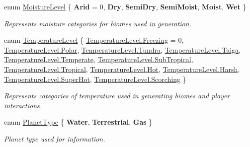 \begin{DoxyCompactItemize}
\item 
enum \hyperlink{namespace_midnight_blue_a7428767e7fc0b52bab6cb270f8354e1d}{Moisture\+Level} \{ \newline
{\bfseries Arid} = 0, 
{\bfseries Dry}, 
{\bfseries Semi\+Dry}, 
{\bfseries Semi\+Moist}, 
\newline
{\bfseries Moist}, 
{\bfseries Wet}
 \}\begin{DoxyCompactList}\small\item\em Represents moisture categories for biomes used in generation. \end{DoxyCompactList}
\item 
enum \hyperlink{namespace_midnight_blue_a6ea6484178cbe707f25d1a0ed56db7ab}{Temperature\+Level} \{ \newline
\hyperlink{namespace_midnight_blue_a6ea6484178cbe707f25d1a0ed56db7aba64a54c31b5b440b2f5a00a723df03ec4}{Temperature\+Level.\+Freezing} = 0, 
\hyperlink{namespace_midnight_blue_a6ea6484178cbe707f25d1a0ed56db7abae266cfd65ad46a67fc54b0efd38e40dd}{Temperature\+Level.\+Polar}, 
\hyperlink{namespace_midnight_blue_a6ea6484178cbe707f25d1a0ed56db7abac63e2bf2eb1c92832e0a76fb3734abe8}{Temperature\+Level.\+Tundra}, 
\hyperlink{namespace_midnight_blue_a6ea6484178cbe707f25d1a0ed56db7aba32864c09ef538453b4d8110734ee355b}{Temperature\+Level.\+Taiga}, 
\newline
\hyperlink{namespace_midnight_blue_a6ea6484178cbe707f25d1a0ed56db7abae83280629ee0ad3886e8921fb8927ced}{Temperature\+Level.\+Temperate}, 
\hyperlink{namespace_midnight_blue_a6ea6484178cbe707f25d1a0ed56db7abaee38ff3caffad90ba40d7fd7ce41c9ae}{Temperature\+Level.\+Sub\+Tropical}, 
\hyperlink{namespace_midnight_blue_a6ea6484178cbe707f25d1a0ed56db7aba4616594df26c58d9dbed290898452f67}{Temperature\+Level.\+Tropical}, 
\hyperlink{namespace_midnight_blue_a6ea6484178cbe707f25d1a0ed56db7aba4194726ee334e1085d93e002837b73f0}{Temperature\+Level.\+Hot}, 
\newline
\hyperlink{namespace_midnight_blue_a6ea6484178cbe707f25d1a0ed56db7abad6b8294df3871e4689e0f4964b4a1219}{Temperature\+Level.\+Harsh}, 
\hyperlink{namespace_midnight_blue_a6ea6484178cbe707f25d1a0ed56db7aba804a73886e309aa19afbc92553edd52a}{Temperature\+Level.\+Super\+Hot}, 
\hyperlink{namespace_midnight_blue_a6ea6484178cbe707f25d1a0ed56db7aba35b2d04e25785c4ddff96c0caf345681}{Temperature\+Level.\+Scorching}
 \}\begin{DoxyCompactList}\small\item\em Represents categories of temperature used in generating biomes and player interactions. \end{DoxyCompactList}
\item 
enum \hyperlink{namespace_midnight_blue_a4a799009a18b57979628708589ae53e3}{Planet\+Type} \{ {\bfseries Water}, 
{\bfseries Terrestrial}, 
{\bfseries Gas}
 \}\begin{DoxyCompactList}\small\item\em Planet type used for information. \end{DoxyCompactList}
\end{DoxyCompactItemize}


